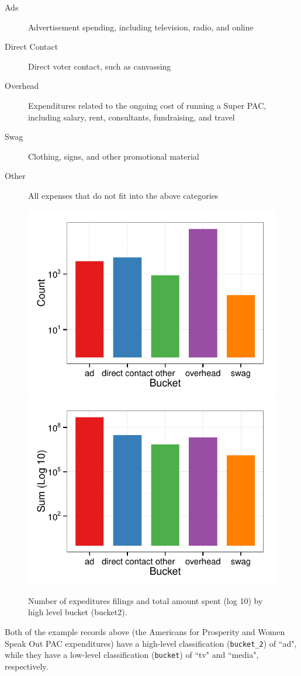 \documentclass[11pt]{article}\usepackage{graphicx, color}
\newenvironment{knitrout}{}{} %
\begin{document}
\begin{description}
    \item[Ads] Advertisement spending, including television, radio, and online
    \item[Direct Contact] Direct voter contact, such as canvassing
    \item[Overhead] Expenditures related to the ongoing cost of running a Super PAC, including salary, rent, consultants, fundraising, and travel
    \item[Swag] Clothing, signs, and other promotional material
    \item[Other] All expenses that do not fit into the above categories
\end{description}

\begin{knitrout}
\color{fgcolor}\begin{figure}[H]


{\centering \includegraphics[width=.45\textwidth]{figure/bucket_plot1} 
\includegraphics[width=.45\textwidth]{figure/bucket_plot2} 

}

\caption[Number of expeditures filings and total amount spent (log 10) by high level bucket (bucket2)]{Number of expeditures filings and total amount spent (log 10) by high level bucket (bucket2).\label{fig:bucket_plot}}
\end{figure}


\end{knitrout}


Both of the example records above (the Americans for Prosperity and Women Speak Out PAC expenditures) have a high-level classification (\texttt{bucket\_2}) of ``ad", while they have a low-level classification (\texttt{bucket}) of ``tv" and ``media", respectively.
\end{document}
